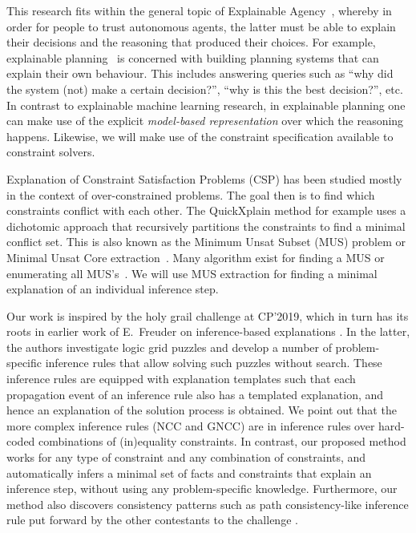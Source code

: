 This research fits within the general topic of Explainable Agency~\cite{langley2017explainable}, whereby in order for people to trust autonomous agents, the latter must be able to explain their decisions and the reasoning that produced their choices. 
For example, explainable planning~\cite{fox2017explainable} is concerned with building planning systems that can explain their own behaviour. This includes answering queries such as ``why did the system (not) make a certain decision?'', ``why is this the best decision?'', etc. In contrast to explainable machine learning research, in explainable planning one can make use of the explicit \textit{model-based representation} over which the reasoning happens. Likewise, we will make use of the constraint specification available to constraint solvers. 

Explanation of Constraint Satisfaction Problems (CSP) has been studied mostly in the context of over-constrained problems. 
The goal then is to find which constraints conflict with each other. 
The QuickXplain method \cite{junker2001quickxplain} for example uses a dichotomic approach that recursively partitions the constraints to find a minimal conflict set. 
This is also known as the Minimum Unsat Subset (MUS) problem or Minimal Unsat Core extraction~\cite{marques2010minimal}. 
Many algorithm exist for finding a MUS or enumerating all MUS's~\cite{marques2010minimal}. 
We will use MUS extraction for finding a minimal explanation of an individual inference step.

Our work is inspired by the holy grail challenge \cite{freuder2018progress} at CP'2019, which in turn has its roots in earlier work of E.~Freuder on inference-based explanations \cite{sqalli1996inference}. 
In the latter, the authors investigate logic grid puzzles and develop a number of problem-specific inference rules that allow solving such puzzles without search. 
These inference rules are equipped with explanation templates such that each propagation event of an inference rule also has a templated explanation, and hence an explanation of the solution process is obtained. 
We point out that the more complex inference rules (NCC and GNCC) are in inference rules over hard-coded combinations of (in)equality constraints. 
In contrast, our proposed method works for any type of constraint and any combination of constraints, and automatically infers a minimal set of facts and constraints that explain an inference step, without using any problem-specific knowledge.
Furthermore, our method also discovers consistency patterns such as path consistency-like inference rule put forward by the other contestants to the challenge \cite{escamocher2019solving}.

